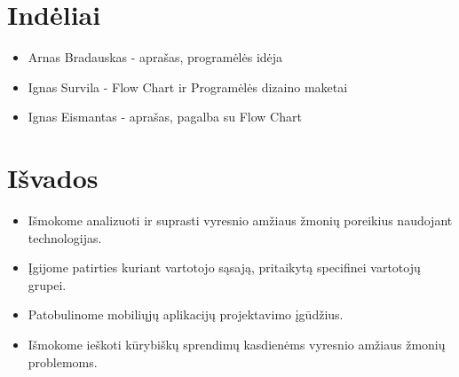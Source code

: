 \documentclass[14pt]{extarticle}
\begin{document}
\clearpage

\section{Indėliai}
\begin{itemize}
	\item Arnas Bradauskas - aprašas, programėlės idėja
	\item Ignas Survila - Flow Chart ir Programėlės dizaino maketai
	\item Ignas Eismantas - aprašas, pagalba su Flow Chart
\end{itemize}

\section{Išvados}

\begin{itemize}
	\item Išmokome analizuoti ir suprasti vyresnio amžiaus žmonių poreikius naudojant technologijas.
	\item Įgijome patirties kuriant vartotojo sąsają, pritaikytą specifinei vartotojų grupei.
	\item Patobulinome mobiliųjų aplikacijų projektavimo įgūdžius.
	\item Išmokome ieškoti kūrybiškų sprendimų kasdienėms vyresnio amžiaus žmonių problemoms.
\end{itemize}
\end{document}
